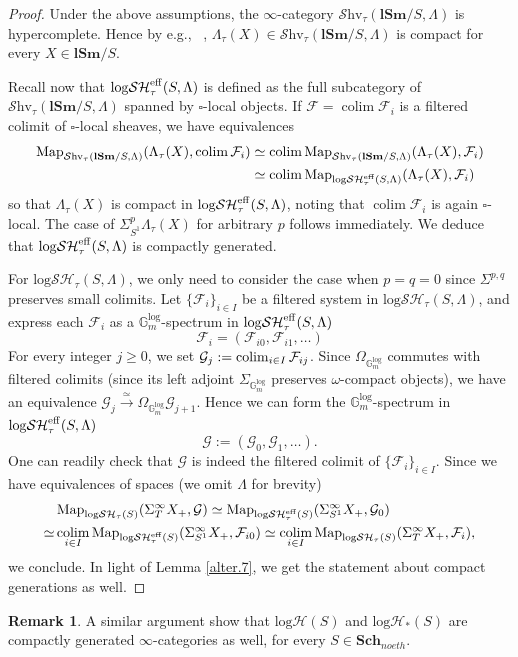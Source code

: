 \documentclass[11pt, a4paper]{amsart}
\theoremstyle{definition}
\newtheorem{rmk}[thm]{Remark}
\numberwithin{equation}{subsection}
\newcommand{\Sch}{\mathbf{Sch}}
\newcommand{\lSm}{\mathbf{lSm}}
\newcommand{\colim}{\operatorname{colim}}		 %
\newcommand{\colimit}{\mathop{\rm colim}}
\newcommand{\cF}{\mathcal{F}}
\newcommand{\cG}{\mathcal{G}}
\newcommand{\boxx}{\square}
\newcommand{\Gmm}{\mathbb{G}_m^{\mathrm{log}}}
\newcommand{\eff}{{\rm eff}}
\newcommand{\infShv}{\mathcal{S}\mathrm{hv}}
\newcommand{\Map}{\operatorname{Map}}
\newcommand{\inflogH}{\mathrm{log}\mathcal{H}}
\newcommand{\inflogSH}{\mathrm{log}\mathcal{SH}}
\begin{document}
\begin{proof}  Under the above assumptions, the $\infty$-category $\infShv_\tau(\lSm/S, \Lambda)$ is hypercomplete. Hence by e.g., \ \cite[Lemma 2.4.5]{AGV},  $\Lambda_\tau(X)\in \infShv_\tau(\lSm/S, \Lambda)$ is compact for every $X\in \lSm/S$.

Recall now that $\inflogSH^\eff_{\tau}(S, \Lambda)$ is defined as the full subcategory of $\infShv_\tau(\lSm/S, \Lambda)$ spanned by $\boxx$-local objects. If $\cF=\colim \cF_i$ is a filtered colimit of $\boxx$-local sheaves, we have equivalences
\begin{align*}
\Map_{\infShv_\tau(\lSm/S, \Lambda)}(\Lambda_\tau(X), \colim \cF_i) &\simeq \colim \Map_{\infShv_\tau(\lSm/S, \Lambda)}(\Lambda_\tau(X), \cF_i) \\
&\simeq  \colim \Map_{\inflogSH^\eff_{\tau}(S, \Lambda)}( \Lambda_\tau(X), \cF_i)
\end{align*}
so that $\Lambda_\tau(X)$ is compact in $\inflogSH^\eff_{\tau}(S, \Lambda)$, noting that $\colim \cF_i$ is again $\boxx$-local. The case of $\Sigma^p_{S^1} \Lambda_\tau(X)$ for arbitrary $p$ follows immediately.
We deduce that $\inflogSH^\eff_\tau(S, \Lambda)$ is compactly generated.

For $\inflogSH_{\tau}(S, \Lambda)$, we only need to consider the case when $p=q=0$ since $\Sigma^{p,q}$ preserves small colimits.
Let $\{\cF_i\}_{i\in I}$ be a filtered system in $\inflogSH_\tau(S, \Lambda)$, and express each $\cF_i$ as a $\Gmm$-spectrum in $\inflogSH_{\tau}^\eff(S, \Lambda)$
\[
\cF_i=(\cF_{i0},\cF_{i1},\ldots)
\]
For every integer $j\geq 0$, we set $\cG_j:=\colimit_{i\in I} \cF_{ij}$.
Since $\Omega_{\Gmm}$ commutes with filtered colimits (since its left adjoint $\Sigma_{\Gmm}$ preserves $\omega$-compact objects), we have an equivalence  $\cG_j\xrightarrow{\simeq} \Omega_{\Gmm}\cG_{j+1}$.
Hence we can form the $\Gmm$-spectrum in $\inflogSH_{\tau}^\eff(S, \Lambda)$
\[
\cG:=(\cG_0,\cG_1,\ldots).
\]
One can readily check that $\cG$ is indeed the filtered colimit of $\{\cF_i\}_{i\in I}$.
Since we have equivalences of spaces (we omit $\Lambda$ for brevity)
\begin{align*}
& \Map_{\inflogSH_{\tau}(S)}(\Sigma_{T}^\infty X_+,\cG)
\simeq
\Map_{\inflogSH_{\tau}^\eff(S)}(\Sigma_{S^1}^\infty X_+,\cG_0)
\\
\simeq &
\colimit_{i\in I} \Map_{\inflogSH_{\tau}^\eff(S)}(\Sigma_{S^1}^\infty X_+,\cF_{i0})
\simeq
\colimit_{i\in I} \Map_{\inflogSH_{\tau}(S)}(\Sigma_T^\infty X_+,\cF_{i}),
\end{align*}
we conclude. In light of Lemma \ref{alter.7}, we get the statement about compact generations as well.
\end{proof}
\begin{rmk}\label{rmk:cpt_gen_variants}
    A similar argument show that $\inflogH(S)$ and $\inflogH_{\ast}(S)$ are compactly generated $\infty$-categories as well, for every $S\in \Sch_{noeth}$.
\end{rmk}
\end{document}
